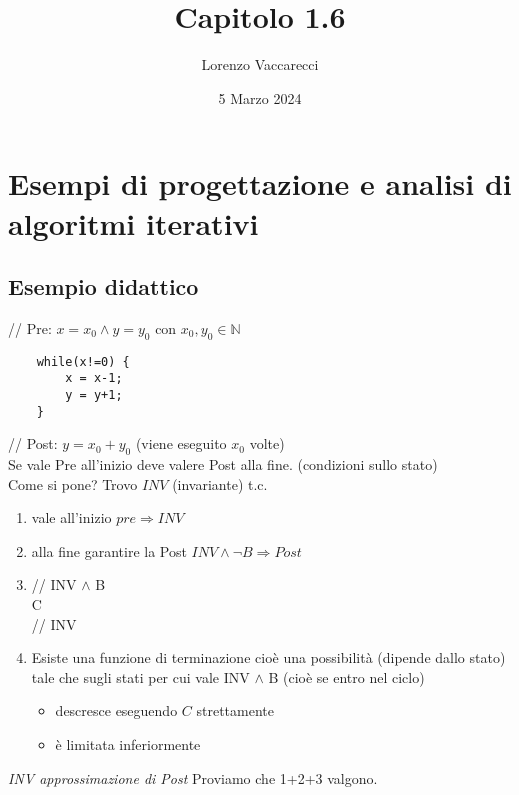 \documentclass[12pt]{article}
\title{Capitolo 1.6}
\author{Lorenzo Vaccarecci}
\date{5 Marzo 2024}
\begin{document}
\maketitle
\section{Esempi di progettazione e analisi di algoritmi iterativi}
\subsection{Esempio didattico}
// Pre: $x=x_{0} \wedge  y=y_{0} \text{ con } x_{0},y_{0} \in \mathbb{N}$
\begin{verbatim}
    while(x!=0) {
        x = x-1;
        y = y+1;
    }
\end{verbatim}
// Post: $y=x_{0}+y_{0}$ (viene eseguito $x_{0}$ volte)\\
Se vale Pre all'inizio deve valere Post alla fine. (condizioni sullo stato)\\
Come si pone? Trovo $INV$ (invariante)  t.c.
\begin{enumerate}
    \item vale all'inizio $pre \Rightarrow INV$
    \item alla fine garantire la Post $INV \wedge  \lnot B \Rightarrow Post$
    \item // INV $\wedge$ B \\ C \\ // INV
    \item Esiste una funzione di terminazione cioè una possibilità (dipende dallo stato) tale che sugli stati per cui vale INV $\wedge $ B (cioè se entro nel ciclo) \begin{itemize}
        \item descresce eseguendo $C$ strettamente
        \item è limitata inferiormente
    \end{itemize}
\end{enumerate}
\textit{INV approssimazione di Post}\newpage
Proviamo che 1+2+3 valgono.
\begin{center}
\end{center}
\end{document}
